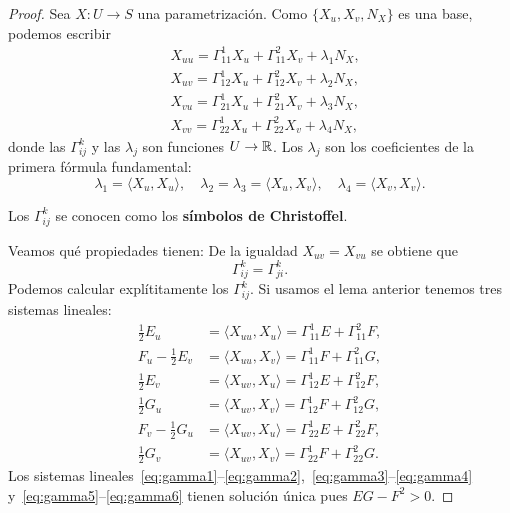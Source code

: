 \begin{proof}
	Sea $X\colon U\to S$ una parametrización. Como $\{X_u,X_v,N_X\}$ es una base, podemos
	escribir
	\begin{equation}
		\label{eq:gamma}
		\begin{aligned}
			& X_{uu}=\Gamma_{11}^1 X_u+\Gamma_{11}^2 X_v+\lambda_1N_X,\\ 
			& X_{uv}=\Gamma_{12}^1 X_u+\Gamma_{12}^2 X_v+\lambda_2N_X,\\ 
			& X_{vu}=\Gamma_{21}^1 X_u+\Gamma_{21}^2 X_v+\lambda_3N_X,\\ 
			& X_{vv}=\Gamma_{22}^1 X_u+\Gamma_{22}^2 X_v+\lambda_4N_X,
		\end{aligned}
	\end{equation}
	donde las $\Gamma_{ij}^k$ y las $\lambda_j$ son funciones $U\to\mathbb{R}$. Los $\lambda_j$ son los coeficientes 
	de la primera fórmula fundamental:
	\[
		\lambda_1=\langle X_u,X_u\rangle,\quad
		\lambda_2=\lambda_3=\langle X_u,X_v\rangle,\quad
		\lambda_4=\langle X_v,X_v\rangle.
	\]

	Los $\Gamma_{ij}^k$ se conocen como los \textbf{símbolos de Christoffel}. 
	
	Veamos qué propiedades tienen: 
	De la igualdad $X_{uv}=X_{vu}$ se obtiene que 
	\[
		\Gamma_{ij}^k=\Gamma_{ji}^k.
	\]
	Podemos calcular explítitamente los $\Gamma_{ij}^k$. Si usamos el lema anterior tenemos
	tres sistemas lineales:
	\begin{align}
		\label{eq:gamma1}\frac12E_u&=\langle X_{uu},X_u\rangle=\Gamma_{11}^1E+\Gamma_{11}^2F,\\
		\label{eq:gamma2}F_u-\frac12E_v&=\langle X_{uu},X_v\rangle=\Gamma_{11}^1F+\Gamma_{11}^2G,\\
		\label{eq:gamma3}\frac12E_v&=\langle X_{uv},X_u\rangle=\Gamma_{12}^1E+\Gamma_{12}^2F,\\
		\label{eq:gamma4}\frac12G_u&=\langle X_{uv},X_v\rangle=\Gamma_{12}^1F+\Gamma_{12}^2G,\\
		\label{eq:gamma5}F_v-\frac12G_u&=\langle X_{uv},X_u\rangle=\Gamma_{22}^1E+\Gamma_{22}^2F,\\
		\label{eq:gamma6}\frac12G_v&=\langle X_{uv},X_v\rangle=\Gamma_{22}^1F+\Gamma_{22}^2G.
	\end{align}
	Los sistemas
	lineales~\eqref{eq:gamma1}--\eqref{eq:gamma2},~\eqref{eq:gamma3}--\eqref{eq:gamma4}
	y~\eqref{eq:gamma5}--\eqref{eq:gamma6} tienen solución única pues
	$EG-F^2>0$. 
	

\end{proof}
